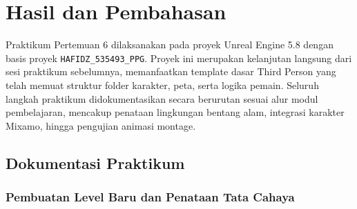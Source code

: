 \documentclass[a4paper,oneside,12pt]{report}
\newcommand{\tocboldsection}[1]{%
  \protect\renewcommand{\protect\cftchapfont}{\protect\bfseries}%
  #1%
  \protect\renewcommand{\protect\cftchapfont}{}%
}
\begin{document}
\chapter[\tocboldsection{Hasil dan Pembahasan}]{Hasil dan Pembahasan}

Praktikum Pertemuan 6 dilaksanakan pada proyek Unreal Engine 5.8 dengan basis proyek \texttt{HAFIDZ\_535493\_PPG}. Proyek ini merupakan kelanjutan langsung dari sesi praktikum sebelumnya, memanfaatkan template dasar Third Person yang telah memuat struktur folder karakter, peta, serta logika pemain. Seluruh langkah praktikum didokumentasikan secara berurutan sesuai alur modul pembelajaran, mencakup penataan lingkungan bentang alam, integrasi karakter Mixamo, hingga pengujian animasi montage.

\section{Dokumentasi Praktikum}

\subsection{Pembuatan Level Baru dan Penataan Tata Cahaya}
\end{document}
